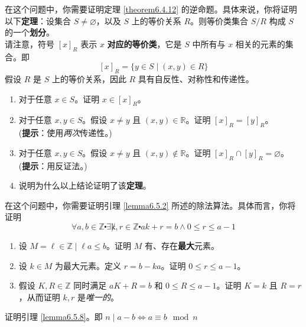 \begin{exercise}\label{exc:exercises6.7.13}
    在这个问题中，你需要证明定理 \ref{theorem6.4.12} 的逆命题。具体来说，你将证明以下\textbf{定理}：设集合 $S \ne \varnothing$，以及 $S$ 上的等价关系 $R$。则等价类集合 $S/R$ 构成 $S$ 的一个\textbf{划分}。\\
    请注意，符号 $[x]_R$ 表示 $x$ \textbf{对应的等价类}，它是 $S$ 中所有与 $x$ 相关的元素的集合。即
    \[[x]_R = \{y \in S \mid (x, y) \in R\}\]
    假设 $R$ 是 $S$ 上的等价关系，因此 $R$ 具有自反性、对称性和传递性。
    \begin{enumerate}[label=(\alph*)]
        \item 对于任意 $x \in S$。证明 $x \in [x]_R$。
        \item 对于任意 $x, y \in S$。假设 $x \ne y$ 且 $(x, y) \in \mathbb{R}$。证明 $[x]_R = [y]_R$。\\
            (\textbf{提示}：使用\emph{两次}传递性。)
        \item 对于任意 $x, y \in S$。假设 $x \ne y$ 且 $(x, y) \notin \mathbb{R}$。证明 $[x]_R \cap [y]_R = \varnothing$。\\
            (\textbf{提示}：用反证法。)
        \item 说明为什么以上结论证明了该\textbf{定理}。
    \end{enumerate}
\end{exercise}

\begin{exercise}\label{exc:exercises6.7.14}
    在这个问题中，你需要证明引理 \ref{lemma6.5.2} 所述的除法算法。具体而言，你将证明
    \[\forall a, b \in \mathbb{Z} \centerdot \exists \not k, r \in \mathbb{Z} \centerdot ak + r = b \land 0 \le r \le a-1\]
    \begin{enumerate}
        \item 设 $M = {\ell \in \mathbb{Z} \mid \ell a \le b}$。证明 $M$ 有、存在\textbf{最大}元素。
        \item 设 $k \in M$ 为最大元素。定义 $r = b-ka$。证明 $0 \le r \le a-1$。
        \item 假设 $K,R \in \mathbb{Z}$ 同时满足 $aK + R = b$ 和 $ 0 \le R \le a-1$。证明 $K=k$ 且 $R=r$，从而证明 $k,r$ 是\emph{唯一的}。
    \end{enumerate}
\end{exercise}

\begin{exercise}\label{exc:exercises6.7.15}
    证明引理 \ref{lemma6.5.8}。即 $n \mid a - b \iff a \equiv b \mod n$
\end{exercise}

